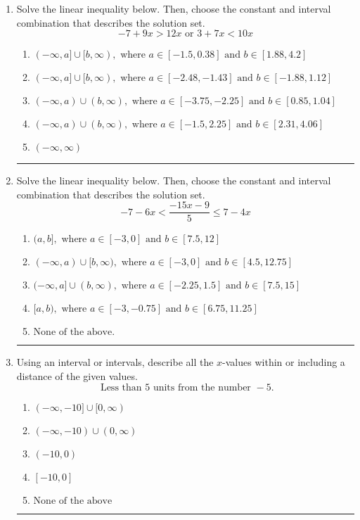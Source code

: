 \documentclass[14pt]{extbook}
\newcommand{\litem}[1]{\item#1\hspace*{-1cm}\rule{\textwidth}{0.4pt}}
\begin{document}
\begin{enumerate}
{\begin{enumerate}[label=\Alph*.]
\end{enumerate} }
\litem{
Solve the linear inequality below. Then, choose the constant and interval combination that describes the solution set.\[ -7 + 9 x > 12 x \text{ or } 3 + 7 x < 10 x \]\begin{enumerate}[label=\Alph*.]
\item \( (-\infty, a] \cup [b, \infty), \text{ where } a \in [-1.5, 0.38] \text{ and } b \in [1.88, 4.2] \)
\item \( (-\infty, a] \cup [b, \infty), \text{ where } a \in [-2.48, -1.43] \text{ and } b \in [-1.88, 1.12] \)
\item \( (-\infty, a) \cup (b, \infty), \text{ where } a \in [-3.75, -2.25] \text{ and } b \in [0.85, 1.04] \)
\item \( (-\infty, a) \cup (b, \infty), \text{ where } a \in [-1.5, 2.25] \text{ and } b \in [2.31, 4.06] \)
\item \( (-\infty, \infty) \)

\end{enumerate} }
\litem{
Solve the linear inequality below. Then, choose the constant and interval combination that describes the solution set.\[ -7 - 6 x < \frac{-15 x - 9}{5} \leq 7 - 4 x \]\begin{enumerate}[label=\Alph*.]
\item \( (a, b], \text{ where } a \in [-3, 0] \text{ and } b \in [7.5, 12] \)
\item \( (-\infty, a) \cup [b, \infty), \text{ where } a \in [-3, 0] \text{ and } b \in [4.5, 12.75] \)
\item \( (-\infty, a] \cup (b, \infty), \text{ where } a \in [-2.25, 1.5] \text{ and } b \in [7.5, 15] \)
\item \( [a, b), \text{ where } a \in [-3, -0.75] \text{ and } b \in [6.75, 11.25] \)
\item \( \text{None of the above.} \)

\end{enumerate} }
\litem{
Using an interval or intervals, describe all the $x$-values within or including a distance of the given values.\[ \text{ Less than } 5 \text{ units from the number } -5. \]\begin{enumerate}[label=\Alph*.]
\item \( (-\infty, -10] \cup [0, \infty) \)
\item \( (-\infty, -10) \cup (0, \infty) \)
\item \( (-10, 0) \)
\item \( [-10, 0] \)
\item \( \text{None of the above} \)


\end{enumerate}}
\end{enumerate}
\end{document}
